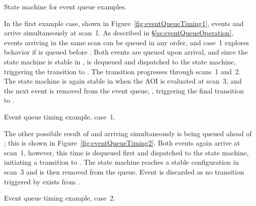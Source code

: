                {State machine for event queue examples.}

In the first example case, shown in Figure~\ref{fig:eventQueueTiming1},
events  and  arrive simultaneously at scan~1.
As described in \S\ref{ss:eventQueueOperation}, events arriving in the same
scan can be queued in any order, and case~1 explores behavior if
 is queued before . Both events are queued
upon arrival,
and since the state machine is stable in , 
is dequeued and dispatched to the state machine, triggering the transition
to . The transition progresses through scans~1 and~2.
The state machine is again stable in  when the AOI is
evaluated at scan~3, and the next event is removed from the event queue,
, triggering the final transition to .

               {Event queue timing example, case~1.}

The other possibile result of  and  arriving
simultaneously is  being queued ahead of ;
this is shown in Figure~\ref{fig:eventQueueTiming2}. Both events again
arrive at scan~1, however, this time  is dequeued first
and dispatched to the state machine, initiating a transition to .
The state machine reaches a stable configuration in scan~3 and 
is then removed from the queue. Event  is discarded as no
transition triggered by  exists from .

               {Event queue timing example, case~2.}
